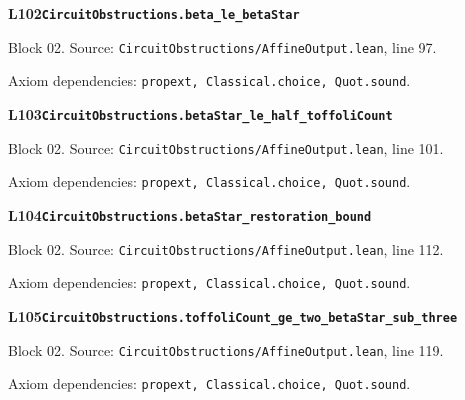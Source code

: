 \begin{minipage}{\linewidth}
\hypertarget{L102}{}
{\small\sffamily\bfseries\color{ink}L102\quad\nolinkurl{CircuitObstructions.beta_le_betaStar}}\par
{\scriptsize\sffamily\color{muted}Block 02. Source: \nolinkurl{CircuitObstructions/AffineOutput.lean}, line 97.}\par
{}
{\scriptsize\sffamily\color{muted}Axiom dependencies: \nolinkurl{propext, Classical.choice, Quot.sound}.}
\end{minipage}\par\medskip
\begin{minipage}{\linewidth}
\hypertarget{L103}{}
{\small\sffamily\bfseries\color{ink}L103\quad\nolinkurl{CircuitObstructions.betaStar_le_half_toffoliCount}}\par
{\scriptsize\sffamily\color{muted}Block 02. Source: \nolinkurl{CircuitObstructions/AffineOutput.lean}, line 101.}\par
{}
{\scriptsize\sffamily\color{muted}Axiom dependencies: \nolinkurl{propext, Classical.choice, Quot.sound}.}
\end{minipage}\par\medskip
{}\par\medskip
\begin{minipage}{\linewidth}
\hypertarget{L104}{}
{\small\sffamily\bfseries\color{ink}L104\quad\nolinkurl{CircuitObstructions.betaStar_restoration_bound}}\par
{\scriptsize\sffamily\color{muted}Block 02. Source: \nolinkurl{CircuitObstructions/AffineOutput.lean}, line 112.}\par
{}
{\scriptsize\sffamily\color{muted}Axiom dependencies: \nolinkurl{propext, Classical.choice, Quot.sound}.}
\end{minipage}\par\medskip
\begin{minipage}{\linewidth}
\hypertarget{L105}{}
{\small\sffamily\bfseries\color{ink}L105\quad\nolinkurl{CircuitObstructions.toffoliCount_ge_two_betaStar_sub_three}}\par
{\scriptsize\sffamily\color{muted}Block 02. Source: \nolinkurl{CircuitObstructions/AffineOutput.lean}, line 119.}\par
{}
{\scriptsize\sffamily\color{muted}Axiom dependencies: \nolinkurl{propext, Classical.choice, Quot.sound}.}
\end{minipage}\par\medskip
